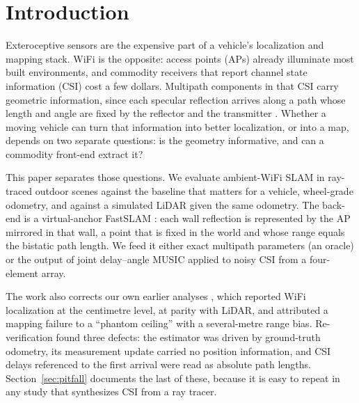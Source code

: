 \documentclass[preprint,12pt]{elsarticle}
\begin{document}
\section{Introduction}\label{sec:intro}

Exteroceptive sensors are the expensive part of a vehicle's localization and mapping stack.
WiFi is the opposite: access points (APs) already illuminate most built environments, and
commodity receivers that report channel state information (CSI) cost a few dollars. Multipath
components in that CSI carry geometric information, since each specular reflection arrives
along a path whose length and angle are fixed by the reflector and the transmitter
\cite{leitinger2015jsac,gentner2016channelslam}. Whether a moving vehicle can turn that
information into better localization, or into a map, depends on two separate questions: is the
geometry informative, and can a commodity front-end extract it?

This paper separates those questions. We evaluate ambient-WiFi SLAM in ray-traced outdoor
scenes against the baseline that matters for a vehicle, wheel-grade odometry, and against a
simulated LiDAR given the same odometry. The back-end is a virtual-anchor FastSLAM
\cite{montemerlo2002fastslam}: each wall reflection is represented by the AP mirrored in that
wall, a point that is fixed in the world and whose range equals the bistatic path length. We
feed it either exact multipath parameters (an oracle) or the output of joint delay--angle MUSIC
\cite{schmidt1986music,shan1985smoothing} applied to noisy CSI from a four-element array.

The work also corrects our own earlier analyses \cite{fetna2026wifiradar}, which reported
WiFi localization at the centimetre level, at parity with LiDAR, and attributed a mapping failure to a
``phantom ceiling'' with a several-metre range bias. Re-verification found three defects: the
estimator was driven by ground-truth odometry, its measurement update carried no position
information, and CSI delays referenced to the first arrival were read as absolute path lengths.
Section~\ref{sec:pitfall} documents the last of these, because it is easy to repeat in any
study that synthesizes CSI from a ray tracer.
\end{document}

